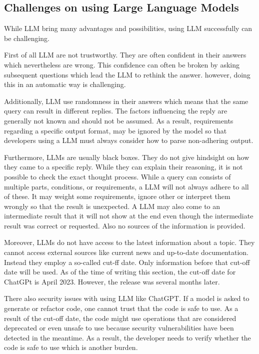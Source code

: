 \subsection{Challenges on using Large Language Models}

While LLM bring many advantages  and possibilities, using \ac{LLM}  successfully can be challenging. 

First of all \ac{LLM} are not trustworthy. They are often confident in their answers which nevertheless are wrong. This confidence can often be broken by asking subsequent questions which lead the \ac{LLM} to rethink the answer. however, doing this in an automatic way is challenging.

Additionally, \ac{LLM} use randomness in their answers which means that the same query can result in different replies. The factors influencing the reply are generally not known and should not be assumed. As a result, requirements regarding a specific output format, may be ignored by the model so that developers using a \ac{LLM} must always consider how to parse non-adhering output. 

Furthermore, \ac{LLM}s are usually black boxes. They do not give hindsight on how they came to a specific reply. While they can explain their reasoning, it is not possible to check the exact thought process.
While a query can consists of multiple parts, conditions, or requirements, a \ac{LLM} will not always adhere to all of these. It may weight some requirements, ignore other or interpret them wrongly so that the result is unexpected. A \ac{LLM} may also come to an intermediate result that it will not show at the end even though the intermediate result was correct or requested. Also no sources of the information is provided. 

Moreover, \ac{LLM}s do not have access to the latest information about a topic. They cannot access external sources like current news  and up-to-date documentation. Instead they employ a so-called cut-ff date. Only information before that cut-off date will be used. As of the time of writing this section, the cut-off date for ChatGPt is April  2023. However, the release was several months later.  

There also security issues with using  \ac{LLM} like ChatGPT. If a model is asked to generate or refactor code, one cannot trust that the code is safe to use. As a result of the cut-off date, the code might use operations that are considered deprecated or even unsafe to use because security vulnerabilities have been detected in the meantime. As a result, the developer needs to verify whether the code is safe to use which is another burden. 

